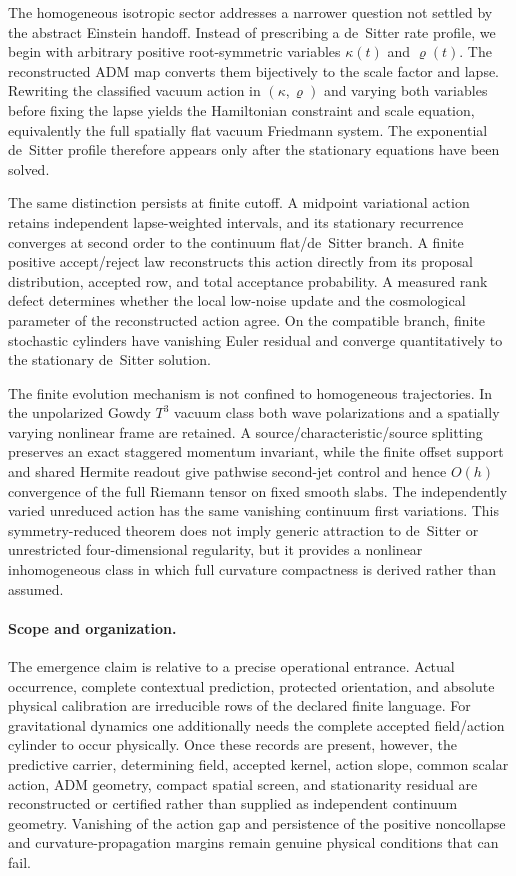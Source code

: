 \documentclass[11pt]{article}
\numberwithin{equation}{section}
\theoremstyle{definition}
\theoremstyle{remark}
\begin{document}
The homogeneous isotropic sector addresses a narrower question not settled by
the abstract Einstein handoff.  Instead of prescribing a de~Sitter rate
profile, we begin with arbitrary positive root-symmetric variables
$\kappa(t)$ and $\varrho(t)$.  The reconstructed ADM map converts them
bijectively to the scale factor and lapse.  Rewriting the classified vacuum
action in $(\kappa,\varrho)$ and varying both variables before fixing the lapse
yields the Hamiltonian constraint and scale equation, equivalently the full
spatially flat vacuum Friedmann system.  The exponential de~Sitter profile
therefore appears only after the stationary equations have been solved.

The same distinction persists at finite cutoff.  A midpoint variational action
retains independent lapse-weighted intervals, and its stationary recurrence
converges at second order to the continuum flat/de~Sitter branch.  A finite
positive accept/reject law reconstructs this action directly from its proposal
distribution, accepted row, and total acceptance probability.  A measured rank
defect determines whether the local low-noise update and the cosmological
parameter of the reconstructed action agree.  On the compatible branch, finite
stochastic cylinders have vanishing Euler residual and converge quantitatively
to the stationary de~Sitter solution.

The finite evolution mechanism is not confined to homogeneous trajectories.
In the unpolarized Gowdy $T^3$ vacuum class both wave polarizations and a
spatially varying nonlinear frame are retained.  A
source/characteristic/source splitting preserves an exact staggered momentum
invariant, while the finite offset support and shared Hermite readout give
pathwise second-jet control and hence $O(h)$ convergence of the full Riemann
tensor on fixed smooth slabs.  The independently varied unreduced action has
the same vanishing continuum first variations.  This symmetry-reduced theorem
does not imply generic attraction to de~Sitter or unrestricted four-dimensional
regularity, but it provides a nonlinear inhomogeneous class in which full
curvature compactness is derived rather than assumed.

\paragraph{Scope and organization.}
The emergence claim is relative to a precise operational entrance.  Actual
occurrence, complete contextual prediction, protected orientation, and
absolute physical calibration are irreducible rows of the declared finite
language.  For gravitational dynamics one additionally needs the complete
accepted field/action cylinder to occur physically.  Once these records are
present, however, the predictive carrier, determining field, accepted kernel,
action slope, common scalar action, ADM geometry, compact spatial screen, and
stationarity residual are reconstructed or certified rather than supplied as
independent continuum geometry.  Vanishing of the action gap and persistence
of the positive noncollapse and curvature-propagation margins remain genuine
physical conditions that can fail.
\end{document}
